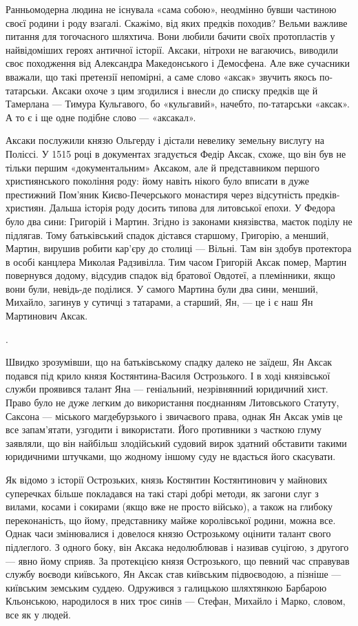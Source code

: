 Ранньомодерна людина не існувала «сама собою», неодмінно бувши частиною своєї
родини і роду взагалі. Скажімо, від яких предків походив? Вельми важливе
питання для тогочасного шляхтича. Вони любили бачити своїх протопластів у
найвідоміших героях античної історії. Аксаки, нітрохи не вагаючись, виводили
своє походження від Александра Македонського і Демосфена. Але вже сучасники
вважали, що такі претензії непомірні, а саме слово «аксак» звучить якось
по-татарськи. Аксаки охоче з цим згодилися і внесли до списку предків ще й
Тамерлана — Тимура Кульгавого, бо «кульгавий», начебто, по-татарськи «аксак». А
то є і ще одне подібне слово — «аксакал».

Аксаки послужили князю Ольгерду і дістали невелику земельну вислугу на Поліссі.
У 1515 році в документах згадується Федір Аксак, схоже, що він був не тільки
першим «документальним» Аксаком, але й представником першого християнського
покоління роду: йому навіть нікого було вписати в дуже престижний Пом’яник
Києво-Печерського монастиря через відсутність предків-християн. Дальша історія
роду досить типова для литовської епохи. У Федора було два сини: Григорій і
Мартин. Згідно із законами князівства, маєток поділу не підлягав. Тому
батьківський спадок дістався старшому, Григорію, а менший, Мартин, вирушив
робити кар’єру до столиці — Вільні. Там він здобув протектора в особі канцлера
Миколая Радзивілла. Тим часом Григорій Аксак помер, Мартин повернувся додому,
відсудив спадок від братової Овдотеї, а племінники, якщо вони були, невідь-де
поділися. У самого Мартина були два сини, менший, Михайло, загинув у сутичці з
татарами, а старший, Ян, — це і є наш Ян Мартинович Аксак.

.

Швидко зрозумівши, що на батьківському спадку далеко не заїдеш, Ян Аксак
подався під крило князя Костянтина-Василя Острозького. І в ході князівської
служби проявився талант Яна — геніальний, незрівнянний юридичний хист. Право
було не дуже легким до використання поєднанням Литовського Статуту, Саксона —
міського магдебурзького і звичаєвого права, однак Ян Аксак умів це все
запам’ятати, узгодити і використати. Його противники з часткою глуму заявляли,
що він найбільш злодійський судовий вирок здатний обставити такими юридичними
штучками, що жодному іншому суду не вдасться його скасувати.

Як відомо з історії Острозьких, князь Костянтин Костянтинович у майнових
суперечках більше покладався на такі старі добрі методи, як загони слуг з
вилами, косами і сокирами (якщо вже не просто військо), а також на глибоку
переконаність, що йому, представнику майже королівської родини, можна все.
Однак часи змінювалися і довелося князю Острозькому оцінити талант свого
підлеглого. З одного боку, він Аксака недолюблював і називав суцігою, з другого
— явно йому сприяв. За протекцією князя Острозького, що певний час справував
службу воєводи київського, Ян Аксак став київським підвоєводою, а пізніше —
київським земським суддею. Одружився з галицькою шляхтянкою Барбарою
Кльонською, народилося в них троє синів — Стефан, Михайло і Марко, словом, все
як у людей.


